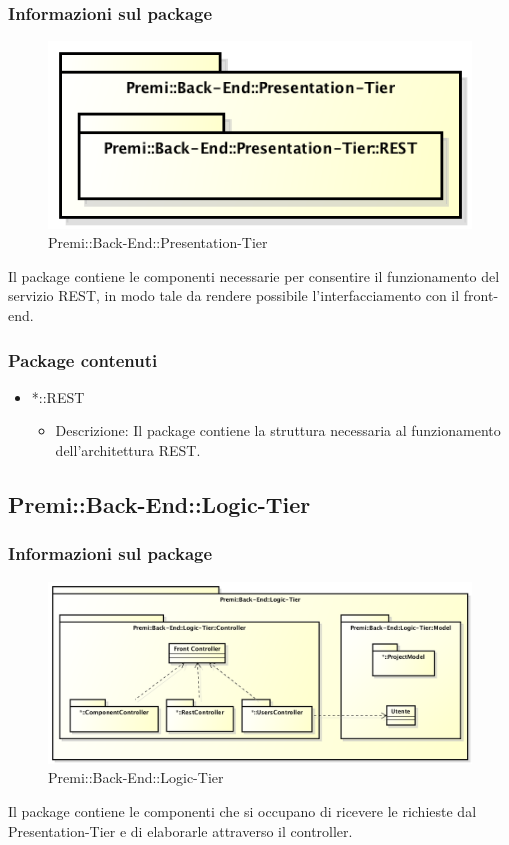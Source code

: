 	\subsubsection{Informazioni sul package}
		\begin{figure}[h]
			\centering
			\includegraphics[width=0.5\linewidth]{img/back-end-package_presentation-tier}
			\caption[Premi::Back-End::Presentation-Tier]{Premi::Back-End::Presentation-Tier}
		\end{figure}
		Il package contiene le componenti necessarie per consentire il funzionamento del servizio REST, in modo tale da rendere possibile l'interfacciamento con il front-end.
		
	\subsubsection{Package contenuti}
		\begin{itemize}
			\item *::REST
			\begin{itemize}
				\item Descrizione: Il package contiene la struttura necessaria al funzionamento dell'architettura REST.
			\end{itemize}
		\end{itemize}
		
		
\subsection{Premi::Back-End::Logic-Tier}
	\subsubsection{Informazioni sul package}
	\begin{figure}[h]
		\centering
		\includegraphics[width=0.7\linewidth]{img/back-end-package_logic-tier}
		\caption[Premi::Back-End::Logic-Tier]{Premi::Back-End::Logic-Tier}
	\end{figure}
	Il package contiene le componenti che si occupano di ricevere le richieste dal Presentation-Tier e di elaborarle attraverso il controller.
	
